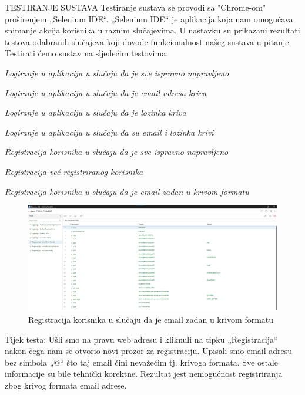 			
			TESTIRANJE SUSTAVA
			\newline \newline
			Testiranje sustava se provodi sa "Chrome-om" proširenjem „Selenium IDE“. „Selenium IDE“ je aplikacija koja nam omogućava snimanje akcija korisnika u raznim slučajevima. U nastavku su prikazani rezultati testova odabranih slučajeva koji dovode funkcionalnost našeg sustava u pitanje. 
			\newline \newline
			Testirati ćemo sustav na sljedećim testovima:
			\begin{packed_item}
				\item \textit{Logiranje u aplikaciju u slučaju da je sve ispravno napravljeno}
				\item \textit{Logiranje u aplikaciju u slučaju da je email adresa kriva}
				\item \textit{Logiranje u aplikaciju u slučaju da je lozinka kriva}
				\item \textit{Logiranje u aplikaciju u slučaju da su email i lozinka krivi}
				\item \textit{Registracija korisnika u slučaju da je sve ispravno napravljeno}
				\item \textit{Registracija već registriranog korisnika}
				\item \textit{Registracija korisnika u slučaju da je email zadan u krivom formatu}
			\end{packed_item}
			
			
			\begin{figure}[H]
				\includegraphics[scale=1]{slike/Ispit1.PNG} %
				\centering
				\caption{Registracija korisnika u slučaju da je email zadan u krivom formatu}
				\label{fig:promjene}
			\end{figure}
			
			
			Tijek testa: Ušli smo na pravu web adresu i kliknuli na tipku „Registracija“ nakon čega nam se otvorio novi prozor za registraciju. Upisali smo email adresu bez simbola „@“ što taj email čini nevažećim tj. krivoga formata. Sve ostale informacije su bile tehnički korektne. Rezultat jest nemogućnost registriranja zbog krivog formata email adrese.
			
